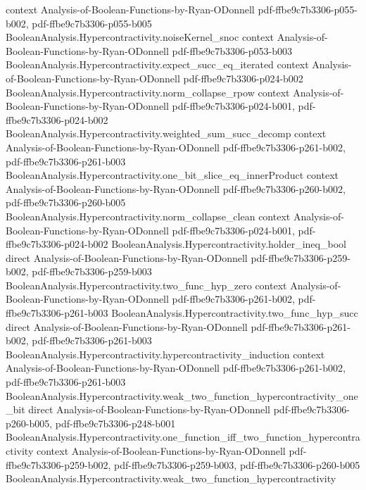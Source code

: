 \begin{lemma}
  {context}
  {Analysis-of-Boolean-Functions-by-Ryan-ODonnell}
  {pdf-ffbe9c7b3306-p055-b002,
    pdf-ffbe9c7b3306-p055-b005}
\proofstep
  {BooleanAnalysis.Hypercontractivity.noiseKernel_snoc}
  {context}
  {Analysis-of-Boolean-Functions-by-Ryan-ODonnell}
  {pdf-ffbe9c7b3306-p053-b003}
\proofstep
  {BooleanAnalysis.Hypercontractivity.expect_succ_eq_iterated}
  {context}
  {Analysis-of-Boolean-Functions-by-Ryan-ODonnell}
  {pdf-ffbe9c7b3306-p024-b002}
\proofstep
  {BooleanAnalysis.Hypercontractivity.norm_collapse_rpow}
  {context}
  {Analysis-of-Boolean-Functions-by-Ryan-ODonnell}
  {pdf-ffbe9c7b3306-p024-b001,
    pdf-ffbe9c7b3306-p024-b002}
\proofstep
  {BooleanAnalysis.Hypercontractivity.weighted_sum_succ_decomp}
  {context}
  {Analysis-of-Boolean-Functions-by-Ryan-ODonnell}
  {pdf-ffbe9c7b3306-p261-b002,
    pdf-ffbe9c7b3306-p261-b003}
\proofstep
  {BooleanAnalysis.Hypercontractivity.one_bit_slice_eq_innerProduct}
  {context}
  {Analysis-of-Boolean-Functions-by-Ryan-ODonnell}
  {pdf-ffbe9c7b3306-p260-b002,
    pdf-ffbe9c7b3306-p260-b005}
\proofstep
  {BooleanAnalysis.Hypercontractivity.norm_collapse_clean}
  {context}
  {Analysis-of-Boolean-Functions-by-Ryan-ODonnell}
  {pdf-ffbe9c7b3306-p024-b001,
    pdf-ffbe9c7b3306-p024-b002}
\proofstep
  {BooleanAnalysis.Hypercontractivity.holder_ineq_bool}
  {direct}
  {Analysis-of-Boolean-Functions-by-Ryan-ODonnell}
  {pdf-ffbe9c7b3306-p259-b002,
    pdf-ffbe9c7b3306-p259-b003}
\proofstep
  {BooleanAnalysis.Hypercontractivity.two_func_hyp_zero}
  {context}
  {Analysis-of-Boolean-Functions-by-Ryan-ODonnell}
  {pdf-ffbe9c7b3306-p261-b002,
    pdf-ffbe9c7b3306-p261-b003}
\proofstep
  {BooleanAnalysis.Hypercontractivity.two_func_hyp_succ}
  {direct}
  {Analysis-of-Boolean-Functions-by-Ryan-ODonnell}
  {pdf-ffbe9c7b3306-p261-b002,
    pdf-ffbe9c7b3306-p261-b003}
\proofstep
  {BooleanAnalysis.Hypercontractivity.hypercontractivity_induction}
  {context}
  {Analysis-of-Boolean-Functions-by-Ryan-ODonnell}
  {pdf-ffbe9c7b3306-p261-b002,
    pdf-ffbe9c7b3306-p261-b003}
\proofstep
  {BooleanAnalysis.Hypercontractivity.weak_two_function_hypercontractivity_one_bit}
  {direct}
  {Analysis-of-Boolean-Functions-by-Ryan-ODonnell}
  {pdf-ffbe9c7b3306-p260-b005,
    pdf-ffbe9c7b3306-p248-b001}
\proofstep
  {BooleanAnalysis.Hypercontractivity.one_function_iff_two_function_hypercontractivity}
  {context}
  {Analysis-of-Boolean-Functions-by-Ryan-ODonnell}
  {pdf-ffbe9c7b3306-p259-b002,
    pdf-ffbe9c7b3306-p259-b003,
    pdf-ffbe9c7b3306-p260-b005}
\proofstep
  {BooleanAnalysis.Hypercontractivity.weak_two_function_hypercontractivity}

\end{lemma}
